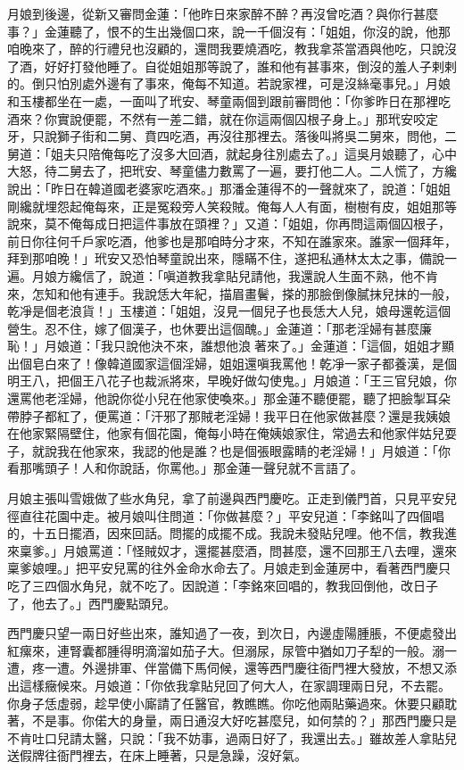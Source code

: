 月娘到後邊，從新又審問金蓮：「他昨日來家醉不醉？再沒曾吃酒？與你行甚麼事？」金蓮聽了，恨不的生出幾個口來，說一千個沒有：「姐姐，你沒的說，他那咱晚來了，醉的行禮兒也沒顧的，還問我要燒酒吃，教我拿茶當酒與他吃，只說沒了酒，好好打發他睡了。自從姐姐那等說了，誰和他有甚事來，倒沒的羞人子剌剌的。倒只怕別處外邊有了事來，俺每不知道。若說家裡，可是沒絲毫事兒。」月娘和玉樓都坐在一處，一面叫了玳安、琴童兩個到跟前審問他：「你爹昨日在那裡吃酒來？你實說便罷，不然有一差二錯，就在你這兩個囚根子身上。」那玳安咬定牙，只說獅子街和二舅、賁四吃酒，再沒往那裡去。落後叫將吳二舅來，問他，二舅道：「姐夫只陪俺每吃了沒多大回酒，就起身往別處去了。」這吳月娘聽了，心中大怒，待二舅去了，把玳安、琴童儘力數罵了一遍，要打他二人。二人慌了，方纔說出：「昨日在韓道國老婆家吃酒來。」那潘金蓮得不的一聲就來了，說道：「姐姐剛纔就埋怨起俺每來，正是冤殺旁人笑殺賊。俺每人人有面，樹樹有皮，姐姐那等說來，莫不俺每成日把這件事放在頭裡？」又道：「姐姐，你再問這兩個囚根子，前日你往何千戶家吃酒，他爹也是那咱時分才來，不知在誰家來。誰家一個拜年，拜到那咱晚！」玳安又恐怕琴童說出來，隱瞞不住，遂把私通林太太之事，備說一遍。月娘方纔信了，說道：「嗔道教我拿貼兒請他，我還說人生面不熟，他不肯來，怎知和他有連手。我說恁大年紀，描眉畫鬢，搽的那臉倒像膩抹兒抹的一般，乾凈是個老浪貨！」玉樓道：「姐姐，沒見一個兒子也長恁大人兒，娘母還乾這個營生。忍不住，嫁了個漢子，也休要出這個醜。」金蓮道：「那老淫婦有甚麼廉恥！」月娘道：「我只說他決不來，誰想他浪𢵞著來了。」金蓮道：「這個，姐姐才顯出個皂白來了！像韓道國家這個淫婦，姐姐還嗔我罵他！乾凈一家子都養漢，是個明王八，把個王八花子也裁派將來，早晚好做勾使鬼。」月娘道：「王三官兒娘，你還罵他老淫婦，他說你從小兒在他家使喚來。」那金蓮不聽便罷，聽了把臉掣耳朵帶脖子都紅了，便罵道：「汗邪了那賊老淫婦！我平日在他家做甚麼？還是我姨娘在他家緊隔壁住，他家有個花園，俺每小時在俺姨娘家住，常過去和他家伴姑兒耍子，就說我在他家來，我認的他是誰？也是個張眼露睛的老淫婦！」月娘道：「你看那嘴頭子！人和你說話，你罵他。」那金蓮一聲兒就不言語了。

月娘主張叫雪娥做了些水角兒，拿了前邊與西門慶吃。正走到儀門首，只見平安兒徑直往花園中走。被月娘叫住問道：「你做甚麼？」平安兒道：「李銘叫了四個唱的，十五日擺酒，因來回話。問擺的成擺不成。我說未發貼兒哩。他不信，教我進來稟爹。」月娘罵道：「怪賊奴才，還擺甚麼酒，問甚麼，還不回那王八去哩，還來稟爹娘哩。」把平安兒罵的往外金命水命去了。月娘走到金蓮房中，看著西門慶只吃了三四個水角兒，就不吃了。因說道：「李銘來回唱的，教我回倒他，改日子了，他去了。」西門慶點頭兒。

西門慶只望一兩日好些出來，誰知過了一夜，到次日，內邊虛陽腫脹，不便處發出紅瘰來，連腎囊都腫得明滴溜如茄子大。但溺尿，尿管中猶如刀子犁的一般。溺一遭，疼一遭。外邊排軍、伴當備下馬伺候，還等西門慶往衙門裡大發放，不想又添出這樣癥候來。月娘道：「你依我拿貼兒回了何大人，在家調理兩日兒，不去罷。你身子恁虛弱，趁早使小廝請了任醫官，教瞧瞧。你吃他兩貼藥過來。休要只顧耽著，不是事。你偌大的身量，兩日通沒大好吃甚麼兒，如何禁的？」那西門慶只是不肯吐口兒請太醫，只說：「我不妨事，過兩日好了，我還出去。」雖故差人拿貼兒送假牌往衙門裡去，在床上睡著，只是急躁，沒好氣。


